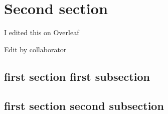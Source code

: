 \documentclass[class=article, crop=false]{standalone}
\begin{document}
\section{Second section}

I edited this on Overleaf

Edit by collaborator

\subsection{first section first subsection}

\blindtext

\subsection{first section second subsection}

\blindtext
\end{document}
